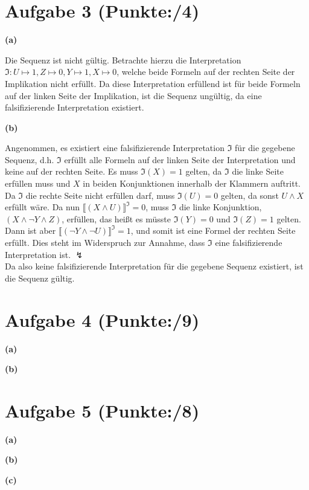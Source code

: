 \documentclass[11pt, a4paper]{article}
\newcommand{\pp}{4}
\newcommand{\ppp}{9}
\newcommand{\pppp}{8}
\begin{document}
\section*{Aufgabe 3 (Punkte:\qquad/\pp)}
\textbf{(a)}
\begin{adjustwidth}{20pt}{20pt}
Die Sequenz ist nicht gültig. Betrachte hierzu die Interpretation $\mathfrak{I}:U \mapsto 1,Z \mapsto 0, Y \mapsto 1, X \mapsto 0$, welche beide Formeln auf der rechten Seite
der Implikation nicht erfüllt. Da diese Interpretation erfüllend ist für beide Formeln auf der linken Seite der Implikation, ist die Sequenz ungültig, da eine falsifizierende Interpretation
existiert.
\end{adjustwidth}
\textbf{(b)}
\begin{adjustwidth}{20pt}{20pt}
Angenommen, es existiert eine falsifizierende Interpretation $\mathfrak{I}$ für die gegebene Sequenz, d.h. $\mathfrak{I}$ erfüllt alle Formeln auf der linken Seite der Interpretation
und keine auf der rechten Seite. Es muss $\mathfrak{I}(X)=1$ gelten, da $\mathfrak{I}$ die linke Seite erfüllen muss und $X$ in beiden Konjunktionen innerhalb der Klammern auftritt.
Da $\mathfrak{I}$ die rechte Seite nicht erfüllen darf, muss $\mathfrak{I}(U)=0$ gelten, da sonst $U \wedge X$ erfüllt wäre. Da nun $\llbracket (X \wedge U)\rrbracket^\mathfrak{I}=0$,
muss $\mathfrak{I}$ die linke Konjunktion, $(X \wedge \neg Y \wedge Z)$, erfüllen, das heißt es müsste $\mathfrak{I}(Y)=0$ und $\mathfrak{I}(Z)=1$ gelten. Dann ist aber
$\llbracket (\neg Y \wedge \neg U)\rrbracket^\mathfrak{I}=1$, und somit ist eine Formel der rechten Seite erfüllt. Dies steht im Widerspruch zur Annahme, dass $\mathfrak{I}$ eine
falsifizierende Interpretation ist. $\lightning$\\
Da also keine falsifizierende Interpretation für die gegebene Sequenz existiert, ist die Sequenz gültig.
\end{adjustwidth}



\section*{Aufgabe 4 (Punkte:\qquad/\ppp)}
\textbf{(a)}
\begin{adjustwidth}{20pt}{20pt}

\end{adjustwidth}
\textbf{(b)}
\begin{adjustwidth}{20pt}{20pt}

\end{adjustwidth}



\section*{Aufgabe 5 (Punkte:\qquad/\pppp)}
\textbf{(a)}
\begin{adjustwidth}{20pt}{20pt}

\end{adjustwidth}
\textbf{(b)}
\begin{adjustwidth}{20pt}{20pt}

\end{adjustwidth}
\textbf{(c)}
\begin{adjustwidth}{20pt}{20pt}

\end{adjustwidth}
\end{document}
